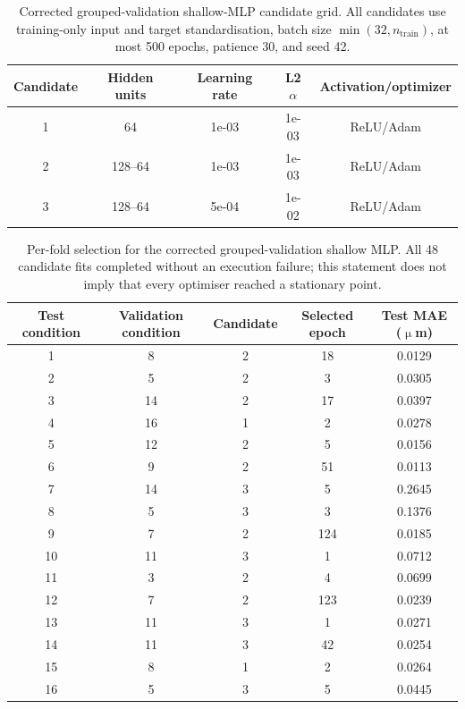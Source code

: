 \begin{table}[htbp]
\centering
\small
\caption{Corrected grouped-validation shallow-MLP candidate grid. All candidates use training-only input and target standardisation, batch size $\min(32,n_{\mathrm{train}})$, at most 500 epochs, patience 30, and seed 42.}
\label{tab:supp-grouped-mlp-grid}
\begin{tabular}{@{}ccccc@{}}
\toprule
Candidate & Hidden units & Learning rate & L2 $\alpha$ & Activation/optimizer \\
\midrule
1 & 64 & 1e-03 & 1e-03 & ReLU/Adam \\
2 & 128--64 & 1e-03 & 1e-03 & ReLU/Adam \\
3 & 128--64 & 5e-04 & 1e-02 & ReLU/Adam \\
\bottomrule
\end{tabular}
\end{table}

\begin{table}[htbp]
\centering
\small
\caption{Per-fold selection for the corrected grouped-validation shallow MLP. All 48 candidate fits completed without an execution failure; this statement does not imply that every optimiser reached a stationary point.}
\label{tab:supp-grouped-mlp-selections}
\begin{tabular}{@{}ccccc@{}}
\toprule
Test condition & Validation condition & Candidate & Selected epoch & Test MAE ($\upmu$m) \\
\midrule
1 & 8 & 2 & 18 & 0.0129 \\
2 & 5 & 2 & 3 & 0.0305 \\
3 & 14 & 2 & 17 & 0.0397 \\
4 & 16 & 1 & 2 & 0.0278 \\
5 & 12 & 2 & 5 & 0.0156 \\
6 & 9 & 2 & 51 & 0.0113 \\
7 & 14 & 3 & 5 & 0.2645 \\
8 & 5 & 3 & 3 & 0.1376 \\
9 & 7 & 2 & 124 & 0.0185 \\
10 & 11 & 3 & 1 & 0.0712 \\
11 & 3 & 2 & 4 & 0.0699 \\
12 & 7 & 2 & 123 & 0.0239 \\
13 & 11 & 3 & 1 & 0.0271 \\
14 & 11 & 3 & 42 & 0.0254 \\
15 & 8 & 1 & 2 & 0.0264 \\
16 & 5 & 3 & 5 & 0.0445 \\
\bottomrule
\end{tabular}
\end{table}
